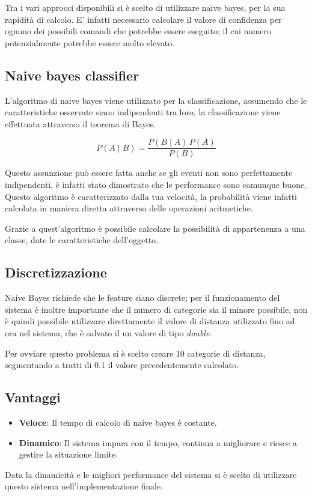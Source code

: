 \documentclass[twoside]{supsistudent}
\begin{document}
Tra i vari approcci disponibili si è scelto di utilizzare naive bayes, per la sua rapidità di calcolo. E' infatti necessario calcolare il valore di confidenza per ognuno dei possibili comandi che potrebbe essere eseguito; il cui numero potenzialmente potrebbe essere molto elevato.
\subsection{Naive bayes classifier}
L'algoritmo di naive bayes viene utilizzato per la classificazione, assumendo che le caratteristiche osservate siano indipendenti tra loro, la classificazione viene effettuata attraverso il teorema di Bayes.

$$ P(A \mid B) = \frac{P(B \mid A) \, P(A)}{P(B)} $$

Questo assunzione può essere fatta anche se gli eventi non sono perfettamente indipendenti, è infatti stato dimostrato che le performance sono comunque buone. Questo algoritmo è caratterizzato dalla tua velocità, la probabilità viene infatti calcolata in maniera diretta attraverso delle operazioni aritmetiche.

Grazie a quest'algoritmo è possibile calcolare la possibilità di appartenenza a una classe, date le caratteristiche dell'oggetto.

\subsection{Discretizzazione}
Naive Bayes richiede che le feature siano discrete; per il funzionamento del sistema è inoltre importante che il numero di categorie sia il minore possibile, non è quindi possibile utilizzare direttamente il valore di distanza utilizzato fino ad ora nel sistema, che è salvato il un valore di tipo \textit{double}.

Per ovviare questo problema si è scelto creare 10 categorie di distanza, segmentando a tratti di 0.1 il valore precedentemente calcolato.
\subsection{Vantaggi}
\begin{itemize}
  \item \textbf{Veloce}: Il tempo di calcolo di naive bayes è costante.
  \item \textbf{Dinamico}: Il sistema impara con il tempo, continua a migliorare e riesce a gestire la situazione limite.
\end{itemize}
Data la dinamicità e le migliori performance del sistema si è scelto di utilizzare questo sistema nell'implementazione finale.
\end{document}
